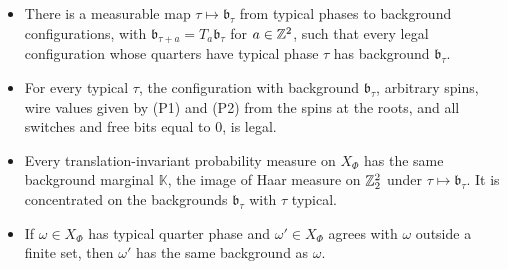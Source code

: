 \begin{proposition}\label{prop:background}
\begin{itemize}
\item[(a)] There is a measurable map $\tau\mapsto\mathfrak b_\tau$ from typical phases to background configurations, with $\mathfrak b_{\tau+a}=T_a\mathfrak b_\tau$ for $a\in\mathbb{Z}^2$, such that every legal configuration whose quarters have typical phase $\tau$ has background $\mathfrak b_\tau$.
\item[(b)] For every typical $\tau$, the configuration with background $\mathfrak b_\tau$, arbitrary spins, wire values given by (P1) and (P2) from the spins at the roots, and all switches and free bits equal to $0$, is legal.
\item[(c)] Every translation-invariant probability measure on $X_\Phi$ has the same background marginal $\mathbb K$, the image of Haar measure on $\mathbb{Z}_2^2$ under $\tau\mapsto\mathfrak b_\tau$. It is concentrated on the backgrounds $\mathfrak b_\tau$ with $\tau$ typical.
\item[(d)] If $\omega\in X_\Phi$ has typical quarter phase and $\omega'\in X_\Phi$ agrees with $\omega$ outside a finite set, then $\omega'$ has the same background as $\omega$.
\end{itemize}
\end{proposition}

